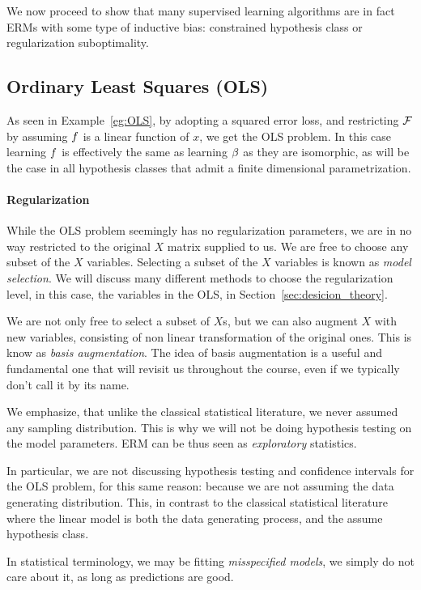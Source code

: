 We now proceed to show that many supervised learning algorithms are in fact ERMs with some type of inductive bias: constrained hypothesis class \andor or regularization \andor suboptimality.

\subsection{Ordinary Least Squares (OLS)}
\label{sec:ols}
As seen in Example~\ref{eg:OLS}, by adopting a squared error loss, and restricting $\mathcal{F}$ by assuming $f$ is a linear function of $x$, we get the OLS problem.
In this case learning $f$ is effectively the same as learning $\beta$ as they are isomorphic, as will be the case in all hypothesis classes that admit a finite dimensional parametrization.

\paragraph{Regularization}
While the OLS problem seemingly has no regularization parameters, we are in no way restricted to the original $X$ matrix supplied to us. 
We are free to choose any subset of the $X$ variables. Selecting a subset of the $X$ variables is known as \emph{model selection}.
We will discuss many different methods to choose the regularization level, in this case, the variables in the OLS, in Section~\ref{sec:desicion_theory}.

We are not only free to select a subset of $X$s, but we can also augment $X$ with new variables, consisting of non linear transformation of the original ones. This is know as \emph{basis augmentation}. 
The idea of basis augmentation is a useful and fundamental one that will revisit us throughout the course, even if we typically don't call it by its name.

\begin{remark}
We emphasize, that unlike the classical statistical literature, we never assumed any sampling distribution. 
This is why we will not be doing hypothesis testing on the model parameters.
ERM can be thus seen as \emph{exploratory} statistics. 

In particular, we are not discussing hypothesis testing and confidence intervals for the OLS problem, for this same reason: because we are not assuming the data generating distribution. This, in contrast to the classical statistical literature where the linear model is both the data generating process, and the assume hypothesis class. 

In statistical terminology, we may be fitting \emph{misspecified models}, we simply do not care about it, as long as predictions are good. 
\end{remark}


